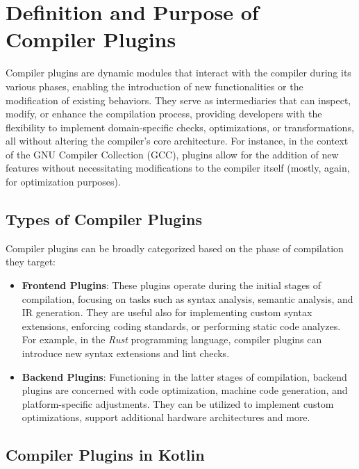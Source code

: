 \documentclass[12pt,a4paper,openright,twoside]{book}
\begin{document}
\section{Definition and Purpose of Compiler Plugins}

Compiler plugins are dynamic modules that interact with the compiler during its
various phases, enabling the introduction of new functionalities or the
modification of existing behaviors. They serve as intermediaries that can
inspect, modify, or enhance the compilation process, providing developers with
the flexibility to implement domain-specific checks, optimizations, or
transformations, all without altering the compiler's core architecture. 
%
For instance, in the context of the GNU Compiler Collection
(GCC), plugins allow for the addition of new features without necessitating
modifications to the compiler itself (mostly, again, for optimization purposes).

\subsection{Types of Compiler Plugins}

Compiler plugins can be broadly categorized based on the phase of compilation they target:

\begin{itemize}
  \item \textbf{Frontend Plugins}: These plugins operate during the initial
  stages of compilation, focusing on tasks such as syntax analysis, semantic
  analysis, and \ac{IR} generation. They are useful also for
  implementing custom syntax extensions, enforcing coding standards, or
  performing static code analyzes. For example, in the \emph{Rust} programming
  language, compiler plugins can introduce new syntax extensions and lint
  checks. 

  \item \textbf{Backend Plugins}: Functioning in the latter stages of
  compilation, backend plugins are concerned with code optimization, machine
  code generation, and platform-specific adjustments. They can be utilized to
  implement custom optimizations, support additional hardware
  architectures and more.
\end{itemize}

\subsection{Compiler Plugins in Kotlin}
\end{document}
